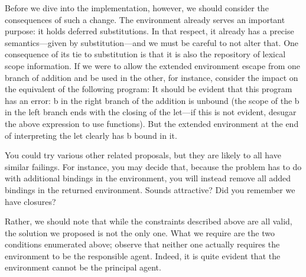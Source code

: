 Before we dive into the implementation, however, we should consider the
consequences of such a change. The environment already serves an important
purpose: it holds deferred substitutions. In that respect, it already has a
precise semantics—given by substitution—and we must be careful to not alter
that. One consequence of its tie to substitution is that it is also the
repository of lexical scope information. If we were to allow the extended
environment escape from one branch of addition and be used in the other, for
instance, consider the impact on the equivalent of the following program:
It should be evident that this program has an error: b in the right branch of
the addition is unbound (the scope of the b in the left branch ends with the
closing of the let—if this is not evident, desugar the above expression to use
functions). But the extended environment at the end of interpreting the let
clearly has b bound in it.

You could try various other related proposals, but they are likely to all have
similar failings. For instance, you may decide that, because the problem has to
do with additional bindings in the environment, you will instead remove all
added bindings in the returned environment. Sounds attractive? Did you remember
we have closures?

Rather, we should note that while the constraints described above are all valid,
the solution we proposed is not the only one. What we require are the two
conditions enumerated above; observe that neither one actually requires the
environment to be the responsible agent. Indeed, it is quite evident that the
environment cannot be the principal agent.
